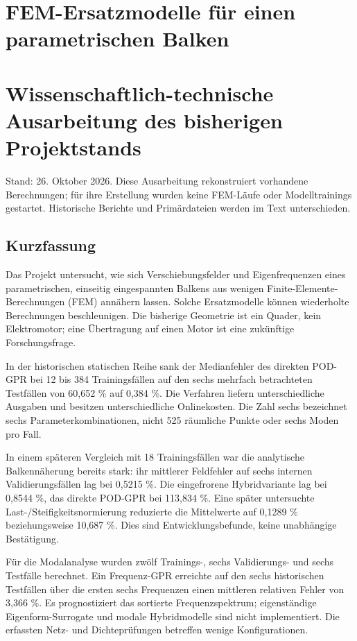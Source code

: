 \documentclass[11pt,a4paper]{article}
\begin{document}
\tableofcontents
\newpage

\section*{FEM-Ersatzmodelle für einen parametrischen Balken}
\section{Wissenschaftlich-technische Ausarbeitung des bisherigen Projektstands}
Stand: 26. Oktober 2026. Diese Ausarbeitung rekonstruiert vorhandene Berechnungen; für ihre Erstellung wurden keine FEM-Läufe oder Modelltrainings gestartet. Historische Berichte und Primärdateien werden im Text unterschieden.

\subsection{Kurzfassung}
Das Projekt untersucht, wie sich Verschiebungsfelder und Eigenfrequenzen eines parametrischen, einseitig eingespannten Balkens aus wenigen Finite-Elemente-Berechnungen (FEM) annähern lassen. Solche Ersatzmodelle können wiederholte Berechnungen beschleunigen. Die bisherige Geometrie ist ein Quader, kein Elektromotor; eine Übertragung auf einen Motor ist eine zukünftige Forschungsfrage.

In der historischen statischen Reihe sank der Medianfehler des direkten POD-GPR bei 12 bis 384 Trainingsfällen auf den sechs mehrfach betrachteten Testfällen von 60,652 \% auf 0,384 \%. Die Verfahren liefern unterschiedliche Ausgaben und besitzen unterschiedliche Onlinekosten. Die Zahl sechs bezeichnet sechs Parameterkombinationen, nicht 525 räumliche Punkte oder sechs Moden pro Fall.

In einem späteren Vergleich mit 18 Trainingsfällen war die analytische Balkennäherung bereits stark: ihr mittlerer Feldfehler auf sechs internen Validierungsfällen lag bei 0,5215 \%. Die eingefrorene Hybridvariante lag bei 0,8544 \%, das direkte POD-GPR bei 113,834 \%. Eine später untersuchte Last-/Steifigkeitsnormierung reduzierte die Mittelwerte auf 0,1289 \% beziehungsweise 10,687 \%. Dies sind Entwicklungsbefunde, keine unabhängige Bestätigung.

Für die Modalanalyse wurden zwölf Trainings-, sechs Validierungs- und sechs Testfälle berechnet. Ein Frequenz-GPR erreichte auf den sechs historischen Testfällen über die ersten sechs Frequenzen einen mittleren relativen Fehler von 3,366 \%. Es prognostiziert das sortierte Frequenzspektrum; eigenständige Eigenform-Surrogate und modale Hybridmodelle sind nicht implementiert. Die erfassten Netz- und Dichteprüfungen betreffen wenige Konfigurationen.
\end{document}
